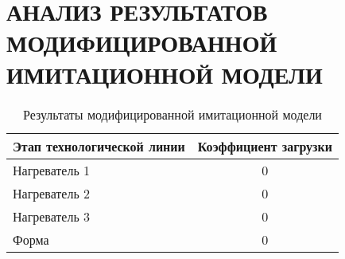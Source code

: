 \section[Анализ результатов модифицированной имитационной модели]{
  АНАЛИЗ РЕЗУЛЬТАТОВ МОДИФИЦИРОВАННОЙ \\
  ИМИТАЦИОННОЙ МОДЕЛИ}

\begin{table}[h!]
  \caption{Результаты модифицированной имитационной модели}
  \label{tbl:base_result}
    \centering
    \small{
    \begin{tabular}{| p{} | c |}
      \hline
      Этап технологической линии & 
      Коэффициент загрузки \\
      \hline

      Нагреватель 1 &
      0 \\
      \hline

      Нагреватель 2 &
      0 \\
      \hline

      Нагреватель 3 &
      0 \\
      \hline

      Форма &
      0 \\
      \hline

    \end{tabular}
    }
\end{table}
